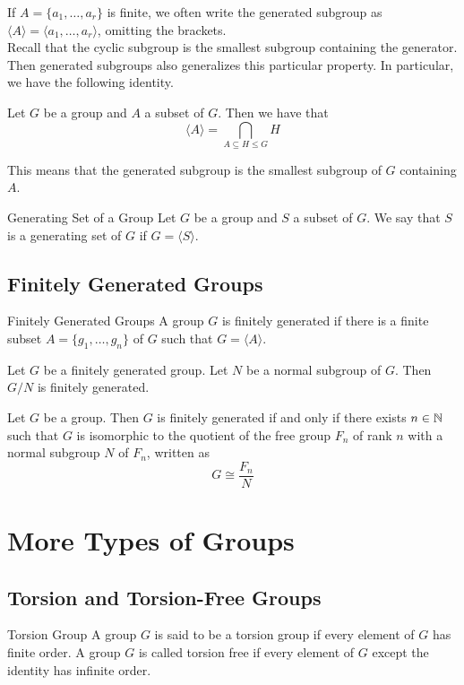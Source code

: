 \documentclass[a4paper]{article}
\begin{document}
If $A=\{a_1,\dots,a_r\}$ is finite, we often write the generated subgroup as $\langle A\rangle=\langle a_1,\dots,a_r\rangle$, omitting the brackets. \\

Recall that the cyclic subgroup is the smallest subgroup containing the generator. Then generated subgroups also generalizes this particular property. In particular, we have the following identity. 

\begin{prp}{}{} Let $G$ be a group and $A$ a subset of $G$. Then we have that $$\langle A\rangle=\bigcap_{A\subseteq H\leq G}H$$
\end{prp}

This means that the generated subgroup is the smallest subgroup of $G$ containing $A$. 

\begin{defn}{Generating Set of a Group}{} Let $G$ be a group and $S$ a subset of $G$. We say that $S$ is a generating set of $G$ if $G=\langle S\rangle$. 
\end{defn}

\subsection{Finitely Generated Groups}
\begin{defn}{Finitely Generated Groups}{} A group $G$ is finitely generated if there is a finite subset $A=\{g_1,\dots,g_n\}$ of $G$ such that $G=\langle A\rangle$. 
\end{defn}

\begin{prp}{}{} Let $G$ be a finitely generated group. Let $N$ be a normal subgroup of $G$. Then $G/N$ is finitely generated. 
\end{prp}

\begin{prp}{}{} Let $G$ be a group. Then $G$ is finitely generated if and only if there exists $n\in\mathbb{N}$ such that $G$ is isomorphic to the quotient of the free group $F_n$ of rank $n$ with a normal subgroup $N$ of $F_n$, written as $$G\cong\frac{F_n}{N}$$
\end{prp}

\pagebreak
\section{More Types of Groups}
\subsection{Torsion and Torsion-Free Groups}
\begin{defn}{Torsion Group}{} A group $G$ is said to be a torsion group if every element of $G$ has finite order. A group $G$ is called torsion free if every element of $G$ except the identity has infinite order. 
\end{defn}
\end{document}
